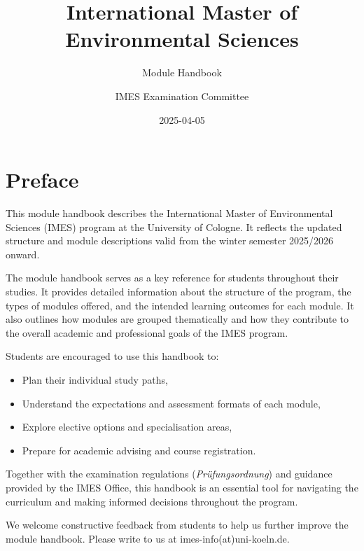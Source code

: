 \documentclass[
  letterpaper,
  10pt,
  openany]{book}
\title{International Master of Environmental Sciences}
\subtitle{Module Handbook}
\author{IMES Examination Committee}
\date{2025-04-05}
\providecommand{\tightlist}{%
  \setlength{\itemsep}{0pt}\setlength{\parskip}{0pt}}\usepackage{longtable,booktabs,array}
\renewcommand*\contentsname{Table of contents}
\newcommand\contentsname{Table of contents}
\begin{document}
\frontmatter
\maketitle

\renewcommand*\contentsname{Table of contents}
{
\setcounter{tocdepth}{0}
\tableofcontents
}

\mainmatter
{}

\chapter*{Preface}\label{preface}


This module handbook describes the International Master of Environmental
Sciences (IMES) program at the University of Cologne. It reflects the
updated structure and module descriptions valid from the winter semester
2025/2026 onward.

The module handbook serves as a key reference for students throughout
their studies. It provides detailed information about the structure of
the program, the types of modules offered, and the intended learning
outcomes for each module. It also outlines how modules are grouped
thematically and how they contribute to the overall academic and
professional goals of the IMES program.

Students are encouraged to use this handbook to:

\begin{itemize}
\tightlist
\item
  Plan their individual study paths,
\item
  Understand the expectations and assessment formats of each module,
\item
  Explore elective options and specialisation areas,
\item
  Prepare for academic advising and course registration.
\end{itemize}

Together with the examination regulations (\emph{Prüfungsordnung}) and
guidance provided by the IMES Office, this handbook is an essential tool
for navigating the curriculum and making informed decisions throughout
the program.

We welcome constructive feedback from students to help us further
improve the module handbook. Please write to us at
imes-info(at)uni-koeln.de.

\end{document}
